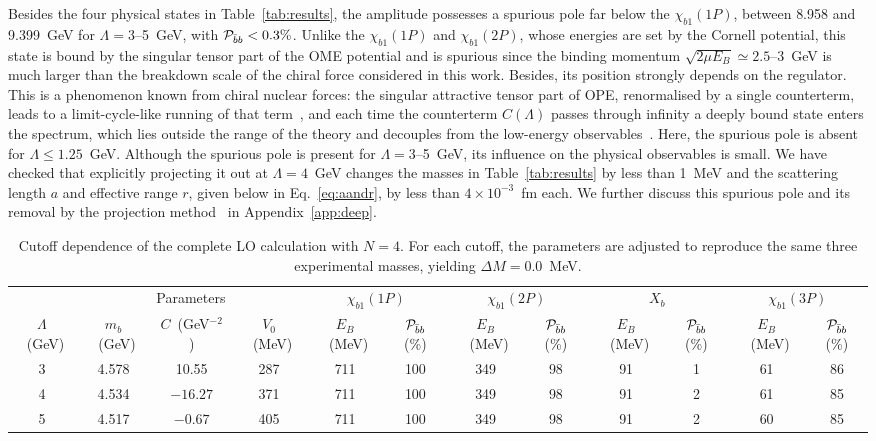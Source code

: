 \documentclass[aps,prd,showpacs,amsmath,twocolumn,superscriptaddress,floatfix,nofootinbib,notitlepage]{revtex4-2}
\newcommand{\Xb}{X_b}
\newcommand{\unit}[1]{~(#1)}
\begin{document}
Besides the four physical states in Table~\ref{tab:results}, the amplitude possesses a spurious pole far below the $\chi_{b1}(1P)$, between 8.958 and 9.399~GeV for $\Lambda=3$--5~GeV, with ${\cal P}_{\bar{b}b}<0.3\%$. Unlike the $\chi_{b1}(1P)$ and $\chi_{b1}(2P)$, whose energies are set by the Cornell potential, this state is bound by the singular tensor part of the OME potential and is spurious since the binding momentum $\sqrt{2\mu E_B}\simeq2.5$--3~GeV is much larger than the breakdown scale of the chiral force considered in this work. Besides, its position strongly depends on the regulator.
This is a phenomenon known from chiral nuclear forces: the singular attractive tensor part of OPE, renormalised by a single counterterm, leads to a limit-cycle-like running of that term~\cite{Wilson:1970ag,Bedaque:1998kg,Beane:2001bc}, and each time the counterterm $C(\Lambda)$ passes through infinity a deeply bound state enters the spectrum, which lies outside the range of the theory and decouples from the low-energy observables~\cite{Beane:2000wh,Nogga:2005hy,Epelbaum:2002ji,Birse:2005um}. 
Here, the spurious pole is absent for $\Lambda\leqslant1.25$~GeV. 
Although the spurious pole is present for $\Lambda=3$--5~GeV, its influence on the physical observables is small.
We have checked that explicitly projecting it out at $\Lambda=4$~GeV changes the masses in Table~\ref{tab:results} by less than 1~MeV and the scattering length $a$ and effective range $r$, given below in Eq.~\eqref{eq:aandr}, by less than $4\times10^{-3}$~fm each.
We further discuss this spurious pole and its removal by the projection method~\cite{Kukulin:1978he,Epelbaum:2002ji,Nogga:2005hy,Yang:2020pgi} in Appendix~\ref{app:deep}.

\begin{table}[t!]
\centering
\caption{Cutoff dependence of the complete LO calculation with $N=4$. For each cutoff, the parameters are adjusted to reproduce the same three experimental masses, yielding $\Delta M=0.0$~MeV.}
\label{tab:cutoff}
\begin{ruledtabular}
\small
\setlength{\tabcolsep}{1.3pt}
\begin{tabular}{c|ccc|cc|cc|cc|cc}
& \multicolumn{3}{c|}{Parameters}
& \multicolumn{2}{c|}{$\chi_{b1}(1P)$}
& \multicolumn{2}{c|}{$\chi_{b1}(2P)$}
& \multicolumn{2}{c|}{$\Xb$}
& \multicolumn{2}{c}{$\chi_{b1}(3P)$} \\
$\Lambda$\unit{GeV} & $m_b$\unit{GeV} & $C$\unit{GeV$^{-2}$}
& $V_0$\unit{MeV}
& $E_B$\unit{MeV} & ${\cal P}_{\bar{b}b}$ (\%)
& $E_B$\unit{MeV} & ${\cal P}_{\bar{b}b}$ (\%)
& $E_B$\unit{MeV} & ${\cal P}_{\bar{b}b}$ (\%)
& $E_B$\unit{MeV} & ${\cal P}_{\bar{b}b}$ (\%) \\
\hline
3 & 4.578 & 10.55 & 287
& 711 & 100 & 349 & 98 & 91 & 1 & 61 & 86 \\
4 & 4.534 & $-16.27$ & 371
& 711 & 100 & 349 & 98 & 91 & 2 & 61 & 85 \\
5 & 4.517 & $-0.67$ & 405
& 711 & 100 & 349 & 98 & 91 & 2 & 60 & 85
\end{tabular}
\end{ruledtabular}
\end{table}
\end{document}
